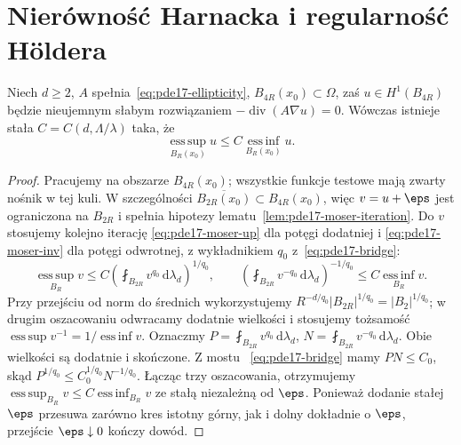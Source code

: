 \section{Nierówność Harnacka i regularność Höldera}
\label{sec:pde17-harnack}
\begin{twierdzenie}
\label{thm:pde17-harnack}
Niech $d\ge2$, $A$ spełnia~\eqref{eq:pde17-ellipticity},
$B_{4R}(x_0)\subset\Omega$, zaś $u\in H^1(B_{4R})$
będzie nieujemnym słabym rozwiązaniem
$-\operatorname{div}(A\nabla u)=0$.
Wówczas istnieje stała $C=C(d,\Lambda/\lambda)$ taka, że
\begin{equation}\label{eq:pde17-harnack}
 \operatorname*{ess\,sup}_{B_R(x_0)}u
 \le C\operatorname*{ess\,inf}_{B_R(x_0)}u.
\end{equation}
\end{twierdzenie}
\begin{proof}
Pracujemy na obszarze $B_{4R}(x_0)$; wszystkie funkcje
testowe mają zwarty nośnik w tej kuli. W szczególności
$\overline{B_{2R}(x_0)}\subset B_{4R}(x_0)$, więc
$v=u+\eps$ jest ograniczona na $B_{2R}$ i spełnia
hipotezy lematu~\ref{lem:pde17-moser-iteration}.
Do $v$ stosujemy kolejno iterację
\eqref{eq:pde17-moser-up} dla potęgi dodatniej i
\eqref{eq:pde17-moser-inv} dla potęgi odwrotnej,
z wykładnikiem $q_0$ z~\eqref{eq:pde17-bridge}:
\[
 \operatorname*{ess\,sup}_{B_R}v
 \le C\left(\fint_{B_{2R}}v^{q_0}\,\mathrm d\lambda_d\right)^{1/q_0},
 \qquad
 \left(\fint_{B_{2R}}v^{-q_0}\,\mathrm d\lambda_d\right)^{-1/q_0}
 \le C\operatorname*{ess\,inf}_{B_R}v.
\]
Przy przejściu od norm do średnich wykorzystujemy
$R^{-d/q_0}|B_{2R}|^{1/q_0}=|B_2|^{1/q_0}$;
w drugim oszacowaniu odwracamy dodatnie wielkości
i stosujemy tożsamość
$\operatorname*{ess\,sup}v^{-1}=1/\operatorname*{ess\,inf}v$.
Oznaczmy $P=\fint_{B_{2R}}v^{q_0}\,\mathrm d\lambda_d$,
$N=\fint_{B_{2R}}v^{-q_0}\,\mathrm d\lambda_d$.
Obie wielkości są dodatnie i skończone. Z mostu
~\eqref{eq:pde17-bridge} mamy $PN\le C_0$, skąd
$P^{1/q_0}\le C_0^{1/q_0}N^{-1/q_0}$.
Łącząc trzy oszacowania, otrzymujemy
$\operatorname*{ess\,sup}_{B_R}v\le
C\operatorname*{ess\,inf}_{B_R}v$ ze stałą niezależną od
$\eps$. Ponieważ dodanie stałej $\eps$ przesuwa zarówno
kres istotny górny, jak i dolny dokładnie o $\eps$,
przejście $\eps\downarrow0$ kończy dowód.
\end{proof}

